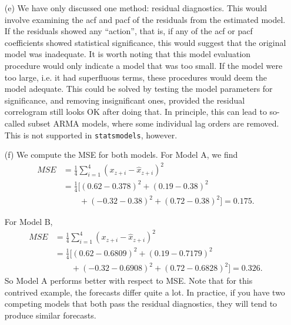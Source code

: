 \documentclass[11pt,a4paper]{article}
\begin{document}
\begin{itemize}
\begin{itemize}
\item[(e)] %
We have only discussed one method: residual diagnostics. This would involve examining the acf
and pacf of the residuals from the estimated model. If the residuals showed
any ``action'', that is, if any of the acf or pacf coefficients showed
statistical significance, this would suggest that the original model was
inadequate. It is worth noting that this model evaluation
procedure would only indicate a model that was too small. If the model were
too large, i.e. it had superfluous terms, these procedures would deem the
model adequate. This could be solved by testing the model parameters for significance, and removing insignificant ones,
provided the residual correlogram still looks OK after doing that. In principle, this can lead to so-called subset ARMA models, where
some individual lag orders are removed. This is not supported in \texttt{statsmodels}, however.
\item[(f)]
We compute the MSE for both models. For Model A, we find
\begin{align*}
MSE &= \frac{1}{4}\sum_{i=1}^4 (x_{z+i}-\hat x_{z+i})^2\\
&=\frac{1}{4}\Big[ (0.62 - 0.378)^2 + (0.19 - 0.38)^2 \\&\qquad+ (-0.32 - 0.38)^2 + (0.72 - 0.38)^2\Big] = 0.175.
\end{align*}

For Model B, 
\begin{align*}
MSE &= \frac{1}{4}\sum_{i=1}^4 (x_{z+i}-\hat x_{z+i})^2\\
&=\frac{1}{4}\Big[ (0.62 -  0.6809)^2 + (0.19 - 0.7179)^2\\&\qquad + (-0.32 - 0.6908)^2 + (0.72 - 0.6828)^2\Big] = 0.326.
\end{align*}
So Model A performs better with respect to MSE. Note that for this contrived example, the forecasts differ quite a lot. In practice, if you have two competing models
that both pass the residual diagnostics, they will tend to produce similar forecasts.
\end{itemize}
\end{itemize}
\newpage
\end{document}
